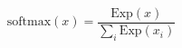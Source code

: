 \documentclass[preview]{standalone}
\begin{document}
\begin{equation}
\tag{5}
    \mathrm{softmax} ( x ) = \frac{\mathrm{Exp} ( x )}{\sum_{i} \mathrm{Exp} ( {x}_{i} )}
\end{equation}
\end{document}
